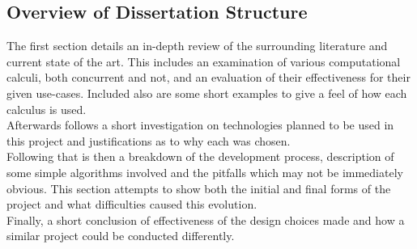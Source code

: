 \subsection{Overview of Dissertation Structure}

    The first section details an in-depth review of the surrounding literature and current state of the art.
    This includes an examination of various computational calculi, both concurrent and not, and an evaluation of their effectiveness for their given use-cases.
    Included also are some short examples to give a feel of how each calculus is used.\\

    Afterwards follows a short investigation on technologies planned to be used in this project and justifications as to why each was chosen.\\

    Following that is then a breakdown of the development process, description of some simple algorithms involved and the pitfalls which may not be immediately obvious.
    This section attempts to show both the initial and final forms of the project and what difficulties caused this evolution.\\

    Finally, a short conclusion of effectiveness of the design choices made and how a similar project could be conducted differently.\\
